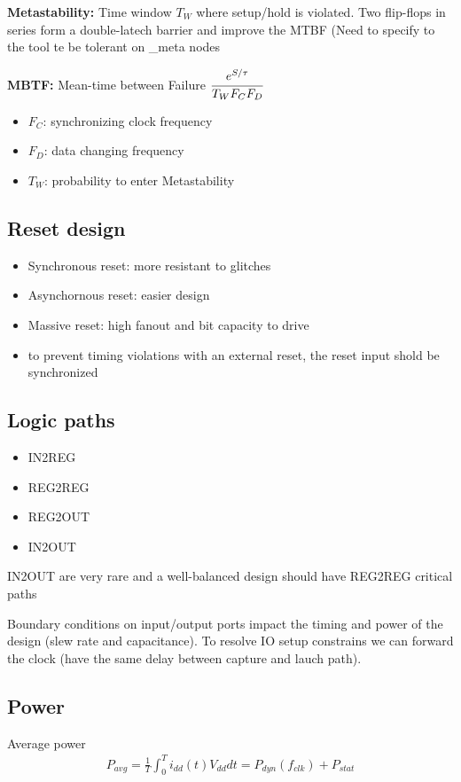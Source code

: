 \textbf{Metastability:} Time window \(T_W\) where setup/hold is violated. Two flip-flops in series form a double-latech barrier and improve the MTBF (Need to specify to the tool te be tolerant on \_meta nodes

\textbf{MBTF:} Mean-time between Failure \( \cfrac{e^{S/\tau}}{T_WF_CF_D}\)
\begin{itemize}
  \item \(F_C\): synchronizing clock frequency
  \item \(F_D\): data changing frequency
\item \(T_W\): probability to enter Metastability
\end{itemize}


\subsection{Reset design}
\begin{itemize}
  \item Synchronous reset: more resistant to glitches
  \item Asynchornous reset: easier design
  \item Massive reset: high fanout and bit capacity to drive
  \item to prevent timing violations with an external reset, the reset input shold be synchronized
\end{itemize}

\subsection{Logic paths}
\begin{itemize}
  \item IN2REG
  \item REG2REG
  \item REG2OUT
  \item IN2OUT
\end{itemize}
IN2OUT are very rare and a well-balanced design should have REG2REG critical paths

\bigbreak
Boundary conditions on input/output ports impact the timing and power of the design (slew rate and capacitance). To resolve IO setup constrains we can forward the clock (have the same delay between capture and lauch path).


\subsection{Power}
Average power
\begin{align}
P_{avg} = \frac{1}{T} \int_0^T i_{dd}(t) V_{dd}dt = P_{dyn}(f_{clk}) + P_{stat}
\end{align}

